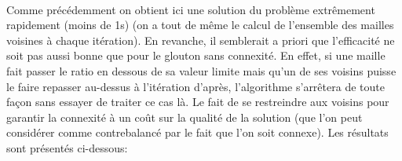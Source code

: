 \documentclass[a4paper, 11pt]{article} %
\begin{document}
\paragraph*{}
Comme précédemment on obtient ici une solution du problème extrêmement rapidement (moins de 1s) (on a tout de même le calcul de l'ensemble des mailles voisines à chaque itération). En revanche, il semblerait a priori que l'efficacité ne soit pas aussi bonne que pour le glouton sans connexité. En effet, si une maille fait passer le ratio en dessous de sa valeur limite mais qu'un de ses voisins puisse le faire repasser au-dessus à l'itération d'après, l'algorithme s'arrêtera de toute façon sans essayer de traiter ce cas là. Le fait de se restreindre aux voisins pour garantir la connexité à un coût sur la qualité de la solution (que l'on peut considérer comme contrebalancé par le fait que l'on soit connexe). Les résultats sont présentés ci-dessous:
 
\end{document}
